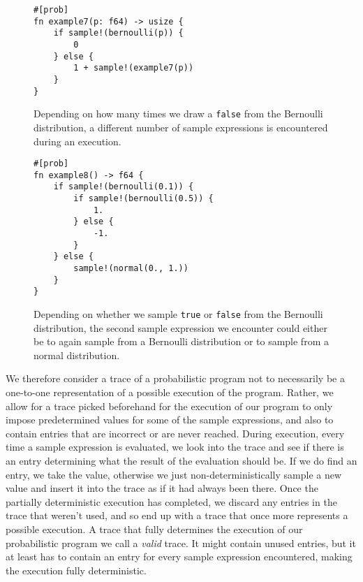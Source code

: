 \begin{figure}[h]
\begin{lstlisting}
#[prob]
fn example7(p: f64) -> usize {
    if sample!(bernoulli(p)) {
        0
    } else {
        1 + sample!(example7(p))
    }
}
\end{lstlisting}
\caption{Depending on how many times we draw a \lstinline{false} from the Bernoulli distribution, a different number of sample expressions is encountered during an execution.}
\label{example7}
\end{figure}


\begin{figure}[h]
\begin{lstlisting}
#[prob]
fn example8() -> f64 {
    if sample!(bernoulli(0.1)) {
        if sample!(bernoulli(0.5)) {
            1.
        } else {
            -1.
        }
    } else {
        sample!(normal(0., 1.))
    }
}
\end{lstlisting}
\caption{Depending on whether we sample \lstinline{true} or \lstinline{false} from the Bernoulli distribution, the second sample expression we encounter could either be to again sample from a Bernoulli distribution or to sample from a normal distribution.}
\label{example8}
\end{figure}

We therefore consider a trace of a probabilistic program not to necessarily be a one-to-one representation of a possible execution of the program. Rather, we allow for a trace picked beforehand for the execution of our program to only impose predetermined values for some of the sample expressions, and also to contain entries that are incorrect or are never reached. During execution, every time a sample expression is evaluated, we look into the trace and see if there is an entry determining what the result of the evaluation should be. If we do find an entry, we take the value, otherwise we just non-deterministically sample a new value and insert it into the trace as if it had always been there. Once the partially deterministic execution has completed, we discard any entries in the trace that weren't used, and so end up with a trace that once more represents a possible execution. A trace that fully determines the execution of our probabilistic program we call a \textit{valid} trace. It might contain unused entries, but it at least has to contain an entry for every sample expression encountered, making the execution fully deterministic.

